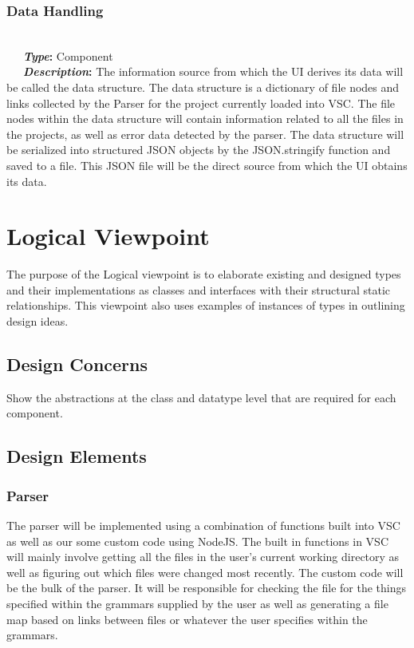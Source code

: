 \documentclass[letterpaper,10pt,titlepage,draftclsnofoot,onecolumn,onesided] {IEEEtran}
\newcommand{\bolditin}[2]{
	\-\ \-\ \-\ \textbf{\textit{#1}#2}
}
\begin{document}
\subsubsection{Data Handling} 
\hfill \\
\bolditin{Type}{:} Component \\
\bolditin{Description}{:}The information source from which the UI derives its data will be called the data structure. 
The data structure is a dictionary of file nodes and links collected by the Parser for the project currently loaded into VSC. 
The file nodes within the data structure will contain information related to all the files in the projects, as well as error data detected by the parser.
The data structure will be serialized into structured JSON objects by the JSON.stringify function and saved to a file. \cite{stringify}
This JSON file will be the direct source from which the UI obtains its data.

\section{Logical Viewpoint}
The purpose of the Logical viewpoint is to elaborate existing and designed types and their implementations
as classes and interfaces with their structural static relationships. This viewpoint also uses examples of
instances of types in outlining design ideas. 

\subsection{Design Concerns}
Show the abstractions at the class and datatype level that are required for each component. 

\subsection{Design Elements}

\subsubsection{Parser}	
The parser will be implemented using a combination of functions built into VSC as well as our some custom code using NodeJS.
The built in functions in VSC will mainly involve getting all the files in the user's current working directory as well as figuring out which files were changed most recently.
The custom code will be the bulk of the parser.
It will be responsible for checking the file for the things specified within the grammars supplied by the user as well as generating a file map based on links between files or whatever the user specifies within the grammars.
	
\end{document}
